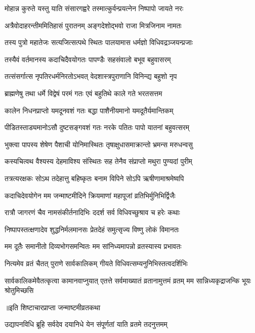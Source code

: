 \twolineshloka
{मोहान्न कुरुते यस्तु याति संसारगह्वरे}
{तस्मात्कुर्वन्प्रयत्नेन निष्पापो जायते नरः}%

\twolineshloka
{अत्रैवोदाहरन्तीममितिहासं पुरातनम्}
{अङ्गदेशोद्भवो राजा मित्रजिनाम नामतः}%

\twolineshloka
{तस्य पुत्रो महातेजः सत्यजित्सत्पथे स्थितः}
{पालयामास धर्मज्ञो विधिवद्रञ्जयन्प्रजाः}%

\twolineshloka
{तस्यैवं वर्तमानस्य कदाचिदैवयोगतः}
{पापण्डैः सहसंवालो बभूव बहुवासरम्}%

\twolineshloka
{तत्संसर्गात्स नृपतिरधर्मनिरतोऽभवत्}
{वेदशास्त्रपुराणानि विनिन्द्य बहुशो नृप}%

\twolineshloka
{ब्राह्मणेषु तथा धर्मे विद्वेषं परमं गतः}
{एवं बहुतिथे काले गते भरतसत्तम}%

\twolineshloka
{कालेन निधनप्राप्तो यमदूनवशं गतः}
{बद्धा पाशैनीयमानो यमदूतैर्यमान्तिकम्}%

\twolineshloka
{पीडितस्ताड्यमानोऽसौ दुष्टसङ्गवशं गतः}
{नरके पतितः पापो यातनां बहुवत्सरम्}%

\twolineshloka
{भुक्त्वा पापस्य शेषेण पैशाची योनिमास्थितः}
{तृषाक्षुधासमाक्रान्तो भ्रमन्स मरुधन्वसु}%

\twolineshloka
{कस्यचित्वथ वैश्यस्य देहमाविश्य संस्थितः}
{सह तेनैव संप्राप्तो मथुरा पुण्यदां पुरीम्}%

\twolineshloka
{तत्रत्यरक्षकः सोऽथ तदेहात्तु बहिष्कृतः}
{बनाम विपिने सोऽपि ऋषीणामाश्रमेष्वपि}%

\twolineshloka
{कदाचिदेवयोगेन मम जन्माष्टमीदिने}
{क्रियमाणां महापूजां व्रतिभिर्मुनिभिर्द्विजैः}%

\twolineshloka
{रात्रौ जागरणं चैव नामसंकीर्तनादिभिः}
{ददर्श सर्व विधिवच्छुश्राव च हरेः कथाः}%

\twolineshloka
{निष्पापस्तत्क्षणादेव शुद्धनिर्मलमानसः}
{प्रेतदेहं समुत्सृज्य विष्णु लोकं विमानतः}%

\twolineshloka
{मम दूतैः समानीतो दिव्यभोगसमन्वितः}
{मम सांनिध्यमापन्नो व्रतस्यास्य प्रभावतः}%

\twolineshloka
{नित्यमेव व्रतं चैतत् पुराणे सार्वकालिकम्}
{गीयते विधिवत्सम्यनुनिभिस्तत्वदर्शिभिः}%

\threelineshloka
{सार्वकालिकमेवैतत्कृत्वा कामानवाप्नुयात्}
{एतत्ते सर्वमाख्यातं व्रतानामुत्तमं व्रतम्}
{मम सान्निध्यकृद्राजन्कि भूयः श्रोतुमिच्छसि}%

\centerline{॥इति शिष्टाचारप्राप्ता जन्माष्टमीव्रतकथा}




\twolineshloka
{उद्यापनविधि ब्रूहि सर्वदेव दयानिधे}
{येन संपूर्णतां याति व्रतमे तदनुत्तमम्}

